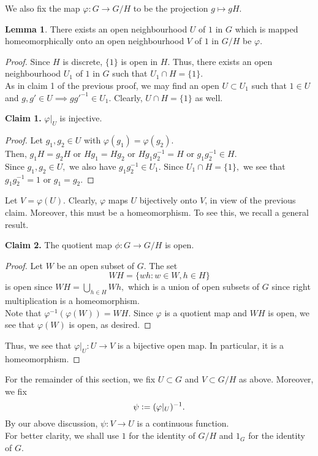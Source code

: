 \documentclass[12pt]{article}
\theoremstyle{definition}
\numberwithin{thm}{section}
\newtheorem{lem}[thm]{Lemma}
\newenvironment{blockquote}
{\begin{mdframed}[skipabove=0pt, skipbelow=0pt, innertopmargin=4pt, innerbottommargin=4pt, bottomline=false,topline=false,rightline=false, linewidth=2pt]}
{\end{mdframed}}
\begin{document}
We also fix the map $\varphi:G \to G/H$ to be the projection $g \mapsto gH.$\\
\begin{lem} 
	There exists an open neighbourhood $U$ of $1$ in $G$ which is mapped homeomorphically onto an open neighbourhood $V$ of $1$ in $G/H$ be $\varphi.$
\end{lem}
\begin{proof} 
	Since $H$ is discrete, $\{1\}$ is open in $H.$ Thus, there exists an open neighbourhood $U_1$ of $1$ in $G$ such that $U_1 \cap H = \{1\}.$\\
	As in claim 1 of the previous proof, we may find an open $U \subset U_1$ such that $1 \in U$ and $g, g' \in U \implies gg'^{-1} \in U_1.$ Clearly, $U \cap H =\{1\}$ as well. \\
	\begin{blockquote}
		\textbf{Claim 1.} $\varphi|_U$ is injective.
	\begin{proof} 
		Let $g_1, g_2 \in U$ with $\varphi(g_1) = \varphi(g_2).$\\
		Then, $g_1H = g_2H$ or $Hg_1 = Hg_2$ or $Hg_1g_2^{-1} = H$ or $g_1g_2^{-1} \in H.$\\
		Since $g_1, g_2 \in U,$ we also have $g_1g_2^{-1} \in U_1.$ Since $U_1 \cap H = \{1\},$ we see that $g_1g_2^{-1} = 1$ or $g_1 = g_2.$
	\end{proof}
	\end{blockquote}
	Let $V = \varphi(U).$ Clearly, $\varphi$ maps $U$ bijectively onto $V$, in view of the previous claim. Moreover, this must be a homeomorphism. To see this, we recall a general result.
	\begin{blockquote}
		\textbf{Claim 2.} The quotient map $\phi:G \to G/H$ is open.
	\begin{proof} 
		Let $W$ be an open subset of $G.$ The set
		\begin{equation*} 
			WH = \{wh : w \in W, h \in H\}
		\end{equation*}
		is open since $WH = \displaystyle\bigcup_{h \in H}Wh,$ which is a union of open subsets of $G$ since right multiplication is a homeomorphism.\\
		Note that $\varphi^{-1}(\varphi(W)) = WH.$ Since $\varphi$ is a quotient map and $WH$ is open, we see that $\varphi(W)$ is open, as desired.
	\end{proof}
	\end{blockquote}
	Thus, we see that $\varphi|_U: U \to V$ is a bijective open map. In particular, it is a homeomorphism.
\end{proof}
For the remainder of this section, we fix $U \subset G$ and $V \subset G/H$ as above. Moreover, we fix
\begin{equation*} 
	\psi \vcentcolon= (\varphi|_U)^{-1}.
\end{equation*}
By our above discussion, $\psi:V \to U$ is a continuous function.\\
For better clarity, we shall use $1$ for the identity of $G/H$ and $1_G$ for the identity of $G.$ 
\end{document}
